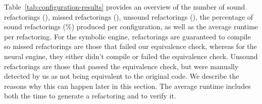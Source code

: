 \documentclass[sigconf]{acmart}
\begin{document}
\begin{table}[h]

\caption{Experimental results for all benchmarks.}
\label{tab:configuration-results}
\end{table}

Table~\ref{tab:configuration-results} provides an overview of the number of
sound refactorings (\checkmark), missed refactorings (\xmark), unsound
refactorings (\lightning), the percentage of sound refactorings (\%)
produced per configuration, as well as the average runtime per refactoring.
For the symbolic engine, refactorings are guaranteed to compile so missed refactorings are those that failed our equivalence check, whereas for the neural engine,
they either didn't compile or failed the equivalence check.
Unsound refactorings are
those that passed the equivalence check, but were manually detected by us as not being equivalent to the original code.
We describe the reasons why this can happen later in this section.
The average runtime includes both the time to generate a refactoring and to verify it.
\end{document}
